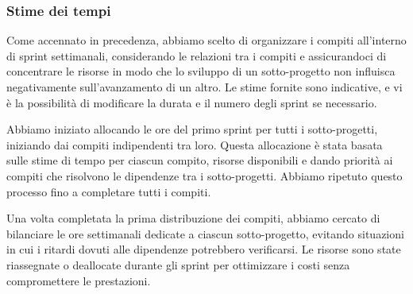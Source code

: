 \subsubsection{Stime dei tempi}
Come accennato in precedenza, abbiamo scelto di organizzare i compiti all'interno di sprint settimanali, considerando le relazioni tra i
compiti e assicurandoci di concentrare le risorse in modo che lo sviluppo di un sotto-progetto non influisca negativamente sull'avanzamento
di un altro. Le stime fornite sono indicative, e vi è la possibilità di modificare la durata e il numero degli sprint se necessario.

Abbiamo iniziato allocando le ore del primo sprint per tutti i sotto-progetti, iniziando dai compiti indipendenti tra loro. Questa allocazione
è stata basata sulle stime di tempo per ciascun compito, risorse disponibili e dando priorità ai compiti che risolvono le dipendenze tra i
sotto-progetti. Abbiamo ripetuto questo processo fino a completare tutti i compiti.

Una volta completata la prima distribuzione dei compiti, abbiamo cercato di bilanciare le ore settimanali dedicate a ciascun sotto-progetto,
evitando situazioni in cui i ritardi dovuti alle dipendenze potrebbero verificarsi. Le risorse sono state riassegnate o deallocate durante gli
sprint per ottimizzare i costi senza compromettere le prestazioni.


